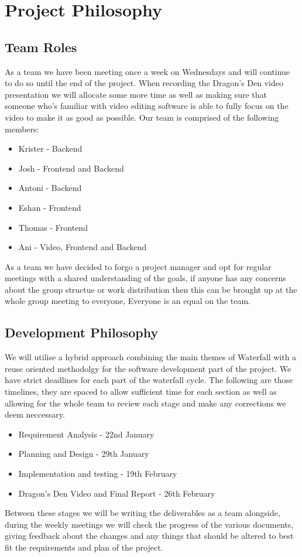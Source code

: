 \documentclass{article}
\begin{document}
\section{Project Philosophy}
\subsection{Team Roles}

As a team we have been meeting once a week on Wednesdays and will continue to do 
so until the end of the project. When recording the Dragon's Den video presentation 
we will allocate some more time as well as making sure that someone who's familiar 
with video editing software is able to fully focus on the video to make it as good
as possible. Our team is comprised of the following members:

\begin{itemize}
  \item Krister - Backend 
  \item Josh - Frontend and Backend 
  \item Antoni - Backend 
  \item Eshan -  Frontend
  \item Thomas - Frontend
  \item Ani - Video, Frontend and Backend
\end{itemize}

As a team we have decided to forgo a project manager and opt for regular meetings 
with a shared understanding of the goals, if anyone has any concerns about the group 
structue or work distribution then this can be brought up at the whole group meeting 
to everyone, Everyone is an equal on the team.

\subsection{Development Philosophy}
We will utilise a hybrid approach combining the main themes of Waterfall with a 
reuse oriented methodolgy for the software development part of the project. We 
have strict deadlines for each part of the waterfall cycle. The following are 
those timelines, they are spaced to allow sufficient time for each section as 
well as allowing for the whole team to review each stage and make any corrections 
we deem neccessary. 

\begin{itemize}
  \item Requirement Analysis
        - 22nd January
  \item Planning and Design
        - 29th January
  \item Implementation and testing
        - 19th February
  \item Dragon's Den Video and Final Report
        - 26th February
\end{itemize}

Between these stages we will be writing the deliverables as a team alongside,
during the weekly meetings we will check the progress of the various documents,
giving feedback about the changes and any things that should be altered to best 
fit the requirements and plan of the project.
\end{document}
